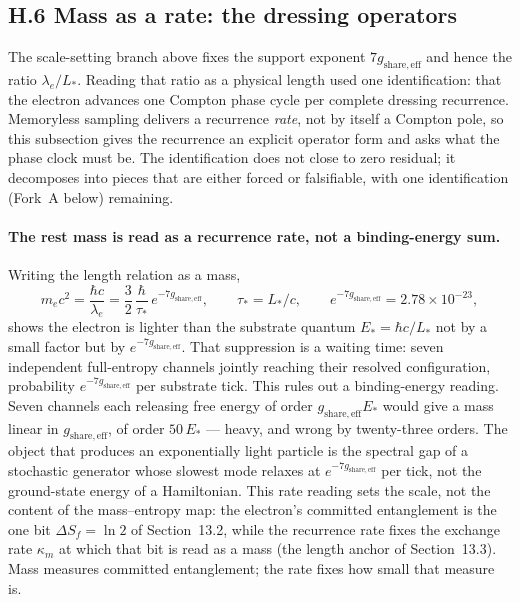 \documentclass[11pt]{article}
\begin{document}
\subsection*{H.6 Mass as a rate: the dressing operators}

The scale-setting branch above fixes the support exponent $7g_{\mathrm{share,eff}}$ and hence the ratio $\lambda_e/L_*$. Reading that ratio as a physical length used one identification: that the electron advances one Compton phase cycle per complete dressing recurrence. Memoryless sampling delivers a recurrence \emph{rate}, not by itself a Compton pole, so this subsection gives the recurrence an explicit operator form and asks what the phase clock must be. The identification does not close to zero residual; it decomposes into pieces that are either forced or falsifiable, with one identification (Fork~A below) remaining.

\paragraph{The rest mass is read as a recurrence rate, not a binding-energy sum.}
Writing the length relation as a mass,
\[
m_e c^2=\frac{\hbar c}{\lambda_e}=\frac{3}{2}\,\frac{\hbar}{\tau_*}\,e^{-7g_{\mathrm{share,eff}}},\qquad \tau_*=L_*/c,\qquad e^{-7g_{\mathrm{share,eff}}}=2.78\times10^{-23},
\]
shows the electron is lighter than the substrate quantum $E_*=\hbar c/L_*$ not by a small factor but by $e^{-7g_{\mathrm{share,eff}}}$. That suppression is a waiting time: seven independent full-entropy channels jointly reaching their resolved configuration, probability $e^{-7g_{\mathrm{share,eff}}}$ per substrate tick. This rules out a binding-energy reading. Seven channels each releasing free energy of order $g_{\mathrm{share,eff}}E_*$ would give a mass linear in $g_{\mathrm{share,eff}}$, of order $50\,E_*$ --- heavy, and wrong by twenty-three orders. The object that produces an exponentially light particle is the spectral gap of a stochastic generator whose slowest mode relaxes at $e^{-7g_{\mathrm{share,eff}}}$ per tick, not the ground-state energy of a Hamiltonian. This rate reading sets the scale, not the content of the mass--entropy map: the electron's committed entanglement is the one bit $\Delta S_f=\ln2$ of Section~13.2, while the recurrence rate fixes the exchange rate $\kappa_m$ at which that bit is read as a mass (the length anchor of Section~13.3). Mass measures committed entanglement; the rate fixes how small that measure is.
\end{document}
